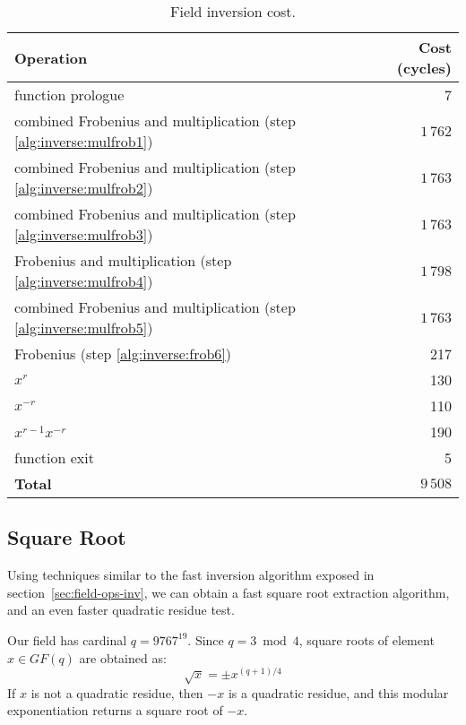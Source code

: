 \documentclass{llncs}
\newcommand{\GF}{GF}
\begin{document}
\begin{table}[H]
\begin{center}
    \begin{tabular}{|l|r|}
    \hline
    \textsf{\textbf{Operation}} & \textsf{\textbf{Cost (cycles)}} \\
    \hline
    function prologue                          &        7 \\
    combined Frobenius and multiplication (step \ref{alg:inverse:mulfrob1})  & $1\,762$ \\
    combined Frobenius and multiplication (step \ref{alg:inverse:mulfrob2})  & $1\,763$ \\
    combined Frobenius and multiplication (step \ref{alg:inverse:mulfrob3})  & $1\,763$ \\
    Frobenius and multiplication (step \ref{alg:inverse:mulfrob4})           & $1\,798$ \\
    combined Frobenius and multiplication (step \ref{alg:inverse:mulfrob5})  & $1\,763$ \\
    Frobenius (step \ref{alg:inverse:frob6})   & 217 \\
    $x^r$                                      & 130 \\
    $x^{-r}$                                   & 110 \\
    $x^{r-1} x^{-r}$                           & 190 \\
    function exit                              &   5 \\
    \hline
    \textsf{\textbf{Total}}                    & $9\,508$ \\
    \hline
    \end{tabular}
\end{center}
\caption{\label{tab:fieldinv}Field inversion cost.}
\end{table}

\subsection{Square Root}\label{sec:field-ops-sqrt}

Using techniques similar to the fast inversion algorithm exposed in
section~\ref{sec:field-ops-inv}, we can obtain a fast square root
extraction algorithm, and an even faster quadratic residue test.

Our field has cardinal $q = 9767^{19}$. Since $q = 3\bmod 4$,
square roots of element $x \in \GF(q)$ are obtained as:
\begin{equation*}
    \sqrt{x} = \pm x^{(q+1)/4}
\end{equation*}
If $x$ is not a quadratic residue, then $-x$ is a quadratic residue, and
this modular exponentiation returns a square root of $-x$.
\end{document}
